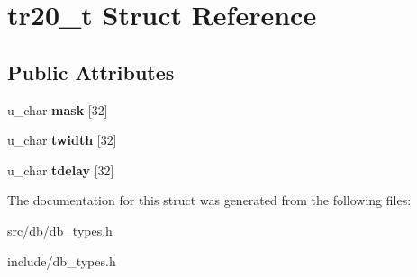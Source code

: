 \hypertarget{structtr20__t}{
\section{tr20\_\-t Struct Reference}
\label{structtr20__t}
}
\subsection*{Public Attributes}
\begin{DoxyCompactItemize}
\item 
\hypertarget{structtr20__t_a4de21b1138e508ebbd90db46909846a5}{
u\_\-char {\bfseries mask} \mbox{[}32\mbox{]}}
\label{structtr20__t_a4de21b1138e508ebbd90db46909846a5}

\item 
\hypertarget{structtr20__t_a5a51059f0947af13c7277c4a0dd4ad0a}{
u\_\-char {\bfseries twidth} \mbox{[}32\mbox{]}}
\label{structtr20__t_a5a51059f0947af13c7277c4a0dd4ad0a}

\item 
\hypertarget{structtr20__t_abcd1762d57d4f78baa1fff9819d70c7e}{
u\_\-char {\bfseries tdelay} \mbox{[}32\mbox{]}}
\label{structtr20__t_abcd1762d57d4f78baa1fff9819d70c7e}

\end{DoxyCompactItemize}


The documentation for this struct was generated from the following files:\begin{DoxyCompactItemize}
\item 
src/db/db\_\-types.h\item 
include/db\_\-types.h\end{DoxyCompactItemize}
